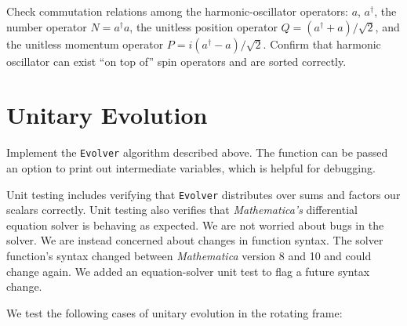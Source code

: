 \documentclass[12pt,letterpaper]{refart}
\begin{document}


Check commutation relations among the harmonic-oscillator operators: $a$, $a^{\dagger}$, the number operator $N = a^{\dagger} a$, the unitless position operator $Q = (a^{\dagger} + a)/\sqrt{2}$, and the unitless momentum operator $P = i (a^{\dagger} - a)/\sqrt{2}$.
Confirm that harmonic oscillator can exist ``on top of'' spin operators and are sorted correctly.



\section{Unitary Evolution}

Implement the \verb+Evolver+ algorithm described above.
The function can be passed an option to print out intermediate variables, which is helpful for debugging.



Unit testing includes verifying that \verb+Evolver+ distributes over sums and factors our scalars correctly.
Unit testing also verifies that \emph{Mathematica's} differential equation solver is behaving as expected.
We are not worried about bugs in the solver. 
We are instead concerned about changes in function syntax.
The solver function's syntax changed between \emph{Mathematica} version 8 and 10 and could change again. 
We added an equation-solver unit test to flag a future syntax change.

We test the following cases of unitary evolution in the rotating frame:
\end{document}
